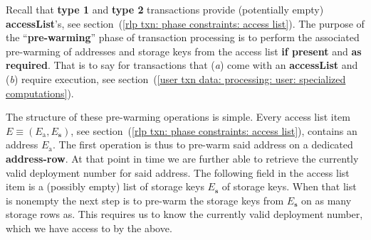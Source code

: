 Recall that \textbf{type 1} and \textbf{type 2} transactions provide (potentially empty) \textbf{accessList}'s,
see section~(\ref{rlp txn: phase constraints: access list}).
The purpose of the ``\textbf{pre-warming}'' phase of transaction processing is to perform the associated pre-warming of addresses and storage keys from the access list \textbf{if present} and \textbf{as required}.
That is to say for transactions that
(\emph{a}) come with an \textbf{accessList} and
(\emph{b}) require \evm{} execution,
see section~(\ref{user txn data: processing: user: specialized computations}).

The structure of these pre-warming operations is simple.
Every access list item $E \equiv (E_\text{a}, E_\textbf{s})$,
see section~(\ref{rlp txn: phase constraints: access list}), contains an address $E_\text{a}$.
The first operation is thus to pre-warm said address on a dedicated \textbf{address-row}.
At that point in time we are further able to retrieve the currently valid deployment number for said address.
The following field in the access list item is a (possibly empty) list of storage keys $E_\textbf{s}$ of storage keys.
When that list is nonempty the next step is to pre-warm the storage keys from $E_\textbf{s}$ on as many storage rows as.
This requires us to know the currently valid deployment number, which we have access to by the above.
